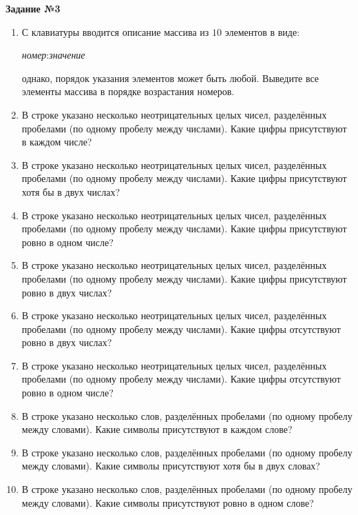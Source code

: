 \textbf{Задание №3}

\begin{enumerate}
\item С клавиатуры вводится описание массива из $10$ элементов в виде:

\textit{номер}:\textit{значение}

однако, порядок указания элементов может быть любой. Выведите все элементы
массива в порядке возрастания номеров.

\item В строке указано несколько неотрицательных целых чисел, разделённых пробелами (по одному
пробелу между числами). Какие цифры присутствуют в каждом числе?

\item В строке указано несколько неотрицательных целых чисел, разделённых пробелами (по одному
пробелу между числами). Какие цифры присутствуют хотя бы в двух числах?

\item В строке указано несколько неотрицательных целых чисел, разделённых пробелами (по одному
пробелу между числами). Какие цифры присутствуют ровно в одном числе?

\item В строке указано несколько неотрицательных целых чисел, разделённых пробелами (по одному
пробелу между числами). Какие цифры присутствуют ровно в двух числах?

\item В строке указано несколько неотрицательных целых чисел, разделённых пробелами (по одному
пробелу между числами). Какие цифры отсутствуют ровно в двух числах?

\item В строке указано несколько неотрицательных целых чисел, разделённых пробелами (по одному
пробелу между числами). Какие цифры отсутствуют ровно в одном числе?

\item В строке указано несколько слов, разделённых пробелами (по одному
пробелу между словами). Какие символы присутствуют в каждом слове? 

\item В строке указано несколько слов, разделённых пробелами (по одному
пробелу между словами). Какие символы присутствуют хотя бы в двух словах?

\item В строке указано несколько слов, разделённых пробелами (по одному
пробелу между словами). Какие символы присутствуют ровно в одном слове?


\end{enumerate}
